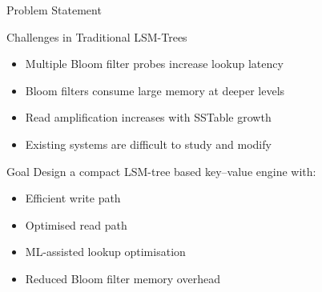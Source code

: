 \documentclass[11pt]{beamer}
\begin{document}
\begin{frame}{Problem Statement}

\begin{block}{Challenges in Traditional LSM-Trees}
\begin{itemize}
    \item Multiple Bloom filter probes increase lookup latency
    \item Bloom filters consume large memory at deeper levels
    \item Read amplification increases with SSTable growth
    \item Existing systems are difficult to study and modify
\end{itemize}
\end{block}

\vspace{4mm}

\begin{block}{Goal}
Design a compact LSM-tree based key--value engine with:
\begin{itemize}
    \item Efficient write path
    \item Optimised read path
    \item ML-assisted lookup optimisation
    \item Reduced Bloom filter memory overhead
\end{itemize}
\end{block}

\end{frame}
\end{document}
